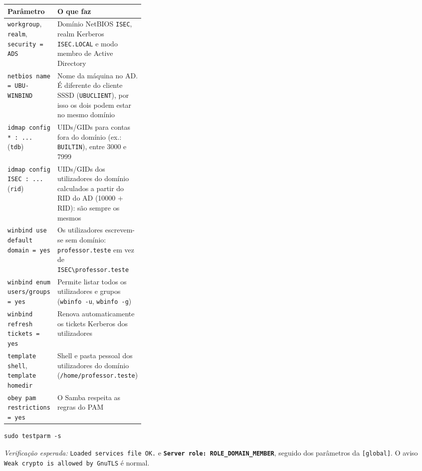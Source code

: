 \begin{center}\small
\begin{tabularx}{\linewidth}{|>{\raggedright\arraybackslash}p{0.32\linewidth}|>{\raggedright\arraybackslash}X|}
\hline
\rowcolor{azul!10}\textbf{Parâmetro} & \textbf{O que faz} \\
\hline
\texttt{workgroup}, \texttt{realm}, \texttt{security = ADS} & Domínio NetBIOS \texttt{ISEC}, realm Kerberos \texttt{ISEC.LOCAL} e modo membro de Active Directory \\
\hline
\texttt{netbios name = UBU-WINBIND} & Nome da máquina no AD. É diferente do cliente SSSD (\texttt{UBUCLIENT}), por isso os dois podem estar no mesmo domínio \\
\hline
\texttt{idmap config * : ...} (\texttt{tdb}) & UIDs/GIDs para contas fora do domínio (ex.: \texttt{BUILTIN}), entre 3000 e 7999 \\
\hline
\texttt{idmap config ISEC : ...} (\texttt{rid}) & UIDs/GIDs dos utilizadores do domínio calculados a partir do RID do AD (10000 + RID): são sempre os mesmos \\
\hline
\texttt{winbind use default domain = yes} & Os utilizadores escrevem-se sem domínio: \texttt{professor.teste} em vez de \texttt{ISEC\textbackslash{}professor.teste} \\
\hline
\texttt{winbind enum users/\allowbreak{}groups = yes} & Permite listar todos os utilizadores e grupos (\texttt{wbinfo -u}, \texttt{wbinfo -g}) \\
\hline
\texttt{winbind refresh tickets = yes} & Renova automaticamente os tickets Kerberos dos utilizadores \\
\hline
\texttt{template shell}, \texttt{template homedir} & Shell e pasta pessoal dos utilizadores do domínio (\texttt{/\allowbreak{}home/\allowbreak{}professor.teste}) \\
\hline
\texttt{obey pam restrictions = yes} & O Samba respeita as regras do PAM \\
\hline
\end{tabularx}
\end{center}


\begin{lstlisting}[style=bashstyle]
sudo testparm -s
\end{lstlisting}

\emph{Verificação esperada:} \texttt{Loaded services file OK.} e \textbf{\texttt{Server role: ROLE\_DOMAIN\_MEMBER}}, seguido dos parâmetros da \texttt{[global]}. O aviso \texttt{Weak crypto is allowed by GnuTLS} é normal.

